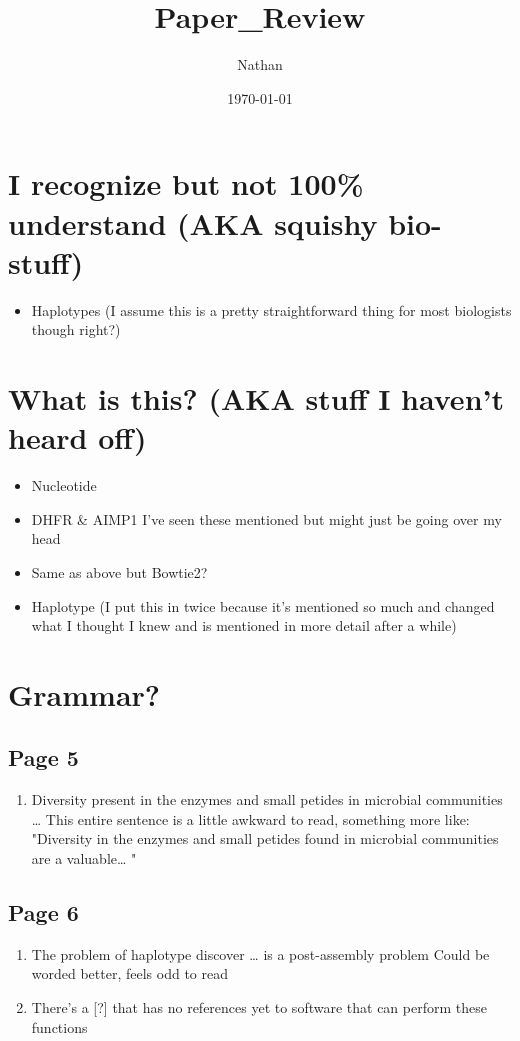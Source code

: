 \documentclass[11pt]{article}
\author{Nathan}
\date{\today}
\title{Paper\_Review}
\begin{document}
\maketitle
\tableofcontents

\section{I recognize but not 100\% understand (AKA squishy bio-stuff)}
\label{sec-1}
\begin{itemize}
\item Haplotypes (I assume this is a pretty straightforward thing for most biologists though right?)
\end{itemize}

\section{What is this? (AKA stuff I haven't heard off)}
\label{sec-2}
\begin{itemize}
\item Nucleotide
\item DHFR \& AIMP1 I've seen these mentioned but might just be going over my head
\item Same as above but Bowtie2?

\item Haplotype (I put this in twice because it's mentioned so much and changed what I thought I knew and is mentioned in more detail after a while)
\end{itemize}

\section{Grammar?}
\label{sec-3}


\subsection{Page 5}
\label{sec-3-1}
\begin{enumerate}
\item Diversity present in the enzymes and small petides in microbial communities \ldots{}
\label{sec-3-1-0-1}
This entire sentence is a little awkward to read, something more like: 
"Diversity in the enzymes and small petides found in microbial communities are a valuable\ldots{} "
\end{enumerate}

\subsection{Page 6}
\label{sec-3-2}
\begin{enumerate}
\item The problem of haplotype discover \ldots{} is a post-assembly problem
\label{sec-3-2-0-1}
Could be worded better, feels odd to read

\item There's a [?] that has no references yet to software that can perform these functions
\label{sec-3-2-0-2}
\end{enumerate}
\end{document}
